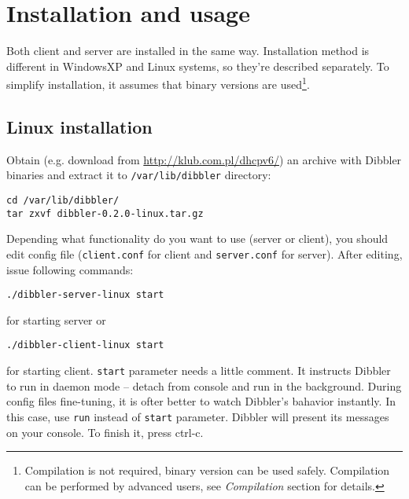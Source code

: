 
\section{Installation and usage}
Both client and server are installed in the same way. Installation
method is different in WindowsXP and Linux systems, so they're described
separately. To simplify installation, it assumes that binary versions
are used\footnote{Compilation is not
  required, binary version can be used safely. Compilation can be performed by
  advanced users, see \emph{Compilation} section for details.}.

\subsection{Linux installation}
Obtain (e.g. download from \url{http://klub.com.pl/dhcpv6/}) an archive with
Dibbler binaries and extract it to \verb+/var/lib/dibbler+ directory:
\begin{verbatim}
cd /var/lib/dibbler/
tar zxvf dibbler-0.2.0-linux.tar.gz 
\end{verbatim}

Depending what functionality do you want to use (server or client),
you should edit config file (\verb+client.conf+ for client and \verb+server.conf+
for server). After editing, issue following commands:

\begin{verbatim}
./dibbler-server-linux start
\end{verbatim}

for starting server or

\begin{verbatim}
./dibbler-client-linux start
\end{verbatim}

for starting client. \verb+start+ parameter needs a little comment. It
instructs Dibbler to run in daemon mode -- detach from console and run
in the background. During config files fine-tuning, it is ofter better
to watch Dibbler's bahavior instantly. In this case, use \verb+run+
instead of \verb+start+ parameter. Dibbler will present its messages on
your console. To finish it, press ctrl-c.

